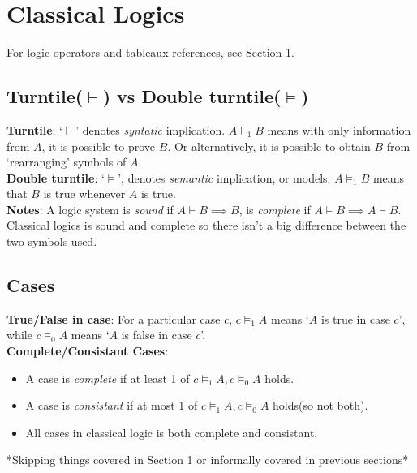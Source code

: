 \documentclass{article}
\begin{document}
\newpage
\section{Classical Logics}
For logic operators and tableaux references, see Section 1.

\subsection{Turntile($\vdash $) vs Double turntile($\models$)}

\noindent
{\large
    \textbf{Turntile}: `$\vdash$' denotes \emph{syntatic} implication. 
    $A \vdash_1 B$ means with only information from $A$, it is possible to prove $B$.
    Or alternatively, it is possible to obtain $B$ from `rearranging' symbols of $A$.\\ 

    \textbf{Double turntile}: `$\models$', denotes \emph{semantic} implication, or models.
    $A \models_1 B$ means that $B$ is true whenever $A$ is true. \\

    \textbf{Notes}: A logic system is \emph{sound} if $A\vdash B \implies B$, is 
    \emph{complete} if $A \models B \implies A \vdash B$. Classical logics is sound and 
    complete so there isn't a big difference between the two symbols used.
}

\subsection{Cases}
\noindent
{
    \large

    \textbf{True/False in case}: For a particular case $c$, $c \models_1 A$ means
    `$A$ is true in case $c$', while $c \models_0 A$ means
    `$A$ is false in case $c$'.\\


    \textbf{Complete/Consistant Cases}: 
    \begin{itemize}
        \item A case is \emph{complete} if at least 1 of $c\models_1 A, c\models_0 A$ holds.
        \item A case is \emph{consistant} if at most 1 of $c\models_1 A, c\models_0 A$ holds(so not both).
        \item All cases in classical logic is both complete and consistant.
    \end{itemize}
    *Skipping things covered in Section 1 or informally covered in previous sections*
}
\end{document}
